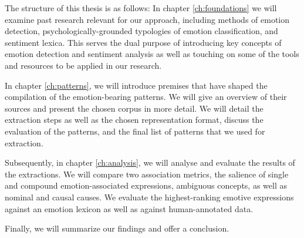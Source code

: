 The structure of this thesis is as follows: In chapter \ref{ch:foundations} we will examine past research relevant for our approach, including methods of emotion detection, psychologically-grounded typologies of emotion classification, and sentiment lexica. This serves the dual purpose of introducing key concepts of emotion detection and sentiment analysis as well as touching on some of the tools and resources to be applied in our research.

In chapter \ref{ch:patterns}, we will introduce premises that have shaped the compilation of the emotion-bearing patterns. We will give an overview of their sources and present the chosen corpus in more detail. We will detail the extraction steps as well as the chosen representation format, discuss the evaluation of the patterns, and the final list of patterns that we used for extraction.

Subsequently, in chapter \ref{ch:analysis}, we will analyse and evaluate the results of the extractions. We will compare two association metrics, the salience of single and compound emotion-associated expressions, ambiguous concepts, as well as nominal and causal causes. We evaluate the highest-ranking emotive expressions against an emotion lexicon as well as against human-annotated data.

Finally, we will summarize our findings and offer a conclusion.

